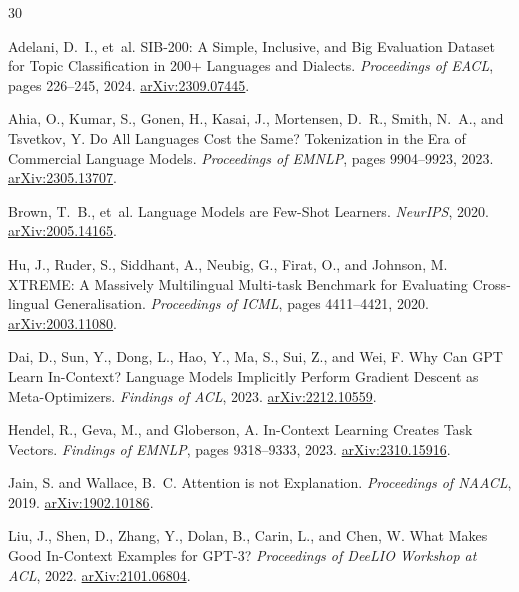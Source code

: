 \documentclass[11pt,a4paper]{article}
\begin{document}
\begin{thebibliography}{30}
\providecommand{\natexlab}[1]{#1}

Adelani, D.~I., et~al.
\newblock SIB-200: A Simple, Inclusive, and Big Evaluation Dataset for Topic Classification in 200+ Languages and Dialects.
\newblock \emph{Proceedings of EACL}, pages 226--245, 2024.
\newblock \href{https://arxiv.org/abs/2309.07445}{arXiv:2309.07445}.

Ahia, O., Kumar, S., Gonen, H., Kasai, J., Mortensen, D.~R., Smith, N.~A., and Tsvetkov, Y.
\newblock Do All Languages Cost the Same? Tokenization in the Era of Commercial Language Models.
\newblock \emph{Proceedings of EMNLP}, pages 9904--9923, 2023.
\newblock \href{https://arxiv.org/abs/2305.13707}{arXiv:2305.13707}.

Brown, T.~B., et~al.
\newblock Language Models are Few-Shot Learners.
\newblock \emph{NeurIPS}, 2020.
\newblock \href{https://arxiv.org/abs/2005.14165}{arXiv:2005.14165}.

Hu, J., Ruder, S., Siddhant, A., Neubig, G., Firat, O., and Johnson, M.
\newblock XTREME: A Massively Multilingual Multi-task Benchmark for Evaluating Cross-lingual Generalisation.
\newblock \emph{Proceedings of ICML}, pages 4411--4421, 2020.
\newblock \href{https://arxiv.org/abs/2003.11080}{arXiv:2003.11080}.

Dai, D., Sun, Y., Dong, L., Hao, Y., Ma, S., Sui, Z., and Wei, F.
\newblock Why Can {GPT} Learn In-Context? Language Models Implicitly Perform Gradient Descent as Meta-Optimizers.
\newblock \emph{Findings of ACL}, 2023.
\newblock \href{https://arxiv.org/abs/2212.10559}{arXiv:2212.10559}.

Hendel, R., Geva, M., and Globerson, A.
\newblock In-Context Learning Creates Task Vectors.
\newblock \emph{Findings of EMNLP}, pages 9318--9333, 2023.
\newblock \href{https://arxiv.org/abs/2310.15916}{arXiv:2310.15916}.

Jain, S. and Wallace, B.~C.
\newblock Attention is not Explanation.
\newblock \emph{Proceedings of NAACL}, 2019.
\newblock \href{https://arxiv.org/abs/1902.10186}{arXiv:1902.10186}.

Liu, J., Shen, D., Zhang, Y., Dolan, B., Carin, L., and Chen, W.
\newblock What Makes Good In-Context Examples for GPT-3?
\newblock \emph{Proceedings of DeeLIO Workshop at ACL}, 2022.
\newblock \href{https://arxiv.org/abs/2101.06804}{arXiv:2101.06804}.


\end{thebibliography}
\end{document}
